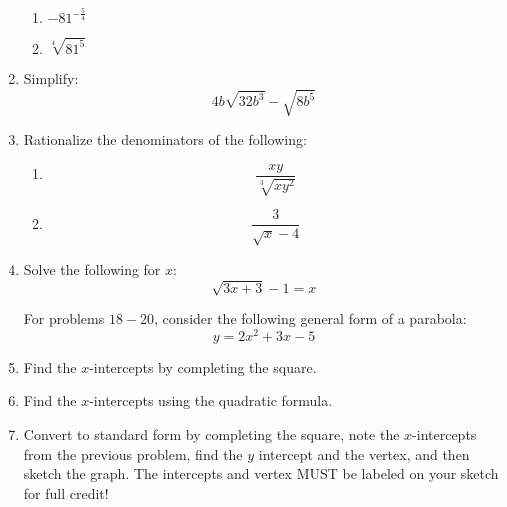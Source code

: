 \documentclass[letterpaper,12pt,fleqn]{article}
\begin{document}
\begin{enumerate}
\begin{enumerate}
  \item $-81^{-\frac{5}{4}}$

  \item $\sqrt[4]{81^5}$
  \end{enumerate}

\item Simplify:
  \[4b\sqrt{32b^3}-\sqrt{8b^5}\]
\newpage
\item Rationalize the denominators of the following:
  \begin{enumerate}
  \item \[\frac{xy}{\sqrt[3]{xy^2}}\]

  \item \[\frac{3}{\sqrt{x}-4}\]
  \end{enumerate}

\item Solve the following for $x$:
  \[\sqrt{3x+3}-1=x\]

  For problems $18-20$, consider the following general form of a parabola:
  \[y=2x^2+3x-5\]

\item Find the $x$-intercepts by completing the square.

\item Find the $x$-intercepts using the quadratic formula.

\item Convert to standard form by completing the square, note the $x$-intercepts from
  the previous problem, find the $y$ intercept and the vertex, and then sketch the graph.
  The intercepts and vertex MUST be labeled on your sketch for full credit!
\end{enumerate}
\end{document}
